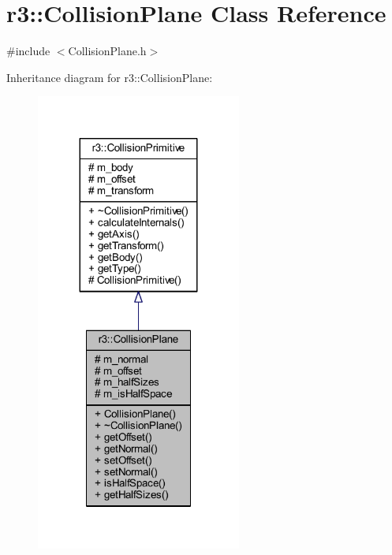 \hypertarget{classr3_1_1_collision_plane}{}\section{r3\+:\+:Collision\+Plane Class Reference}
\label{classr3_1_1_collision_plane}


{\ttfamily \#include $<$Collision\+Plane.\+h$>$}



Inheritance diagram for r3\+:\+:Collision\+Plane\+:\nopagebreak
\begin{figure}[H]
\begin{center}
\leavevmode
\includegraphics[width=191pt]{classr3_1_1_collision_plane__inherit__graph}
\end{center}
\end{figure}


